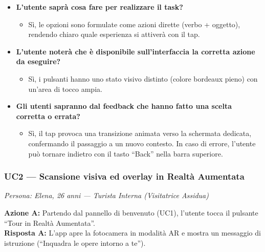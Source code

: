 \begin{itemize}[nosep, leftmargin=1.6em]
    \item \textbf{L'utente saprà cosa fare per realizzare il task?}
    \begin{itemize}[nosep, leftmargin=1.6em]
        \item Sì, le opzioni sono formulate come azioni dirette (verbo + oggetto), rendendo chiaro quale esperienza si attiverà con il tap.
    \end{itemize}
    \item \textbf{L'utente noterà che è disponibile sull'interfaccia la corretta azione da eseguire?}
    \begin{itemize}[nosep, leftmargin=1.6em]
        \item Sì, i pulsanti hanno uno stato visivo distinto (colore bordeaux pieno) con un'area di tocco ampia.
    \end{itemize}
    \item \textbf{Gli utenti sapranno dal feedback che hanno fatto una scelta corretta o errata?}
    \begin{itemize}[nosep, leftmargin=1.6em]
        \item Sì, il tap provoca una transizione animata verso la schermata dedicata, confermando il passaggio a un nuovo contesto. In caso di errore, l'utente può tornare indietro con il tasto ``Back'' nella barra superiore.
    \end{itemize}
\end{itemize}

\vspace{0.5cm}
\subsubsection{UC2 --- Scansione visiva ed overlay in Realtà Aumentata}
\textit{Persona: Elena, 26 anni --- Turista Interna (Visitatrice Assidua)}

\vspace{0.3cm}

\noindent\textbf{Azione A:} Partendo dal pannello di benvenuto (UC1), l'utente tocca il pulsante ``Tour in Realtà Aumentata''.\\
\textbf{Risposta A:} L'app apre la fotocamera in modalità AR e mostra un messaggio di istruzione (``Inquadra le opere intorno a te'').

